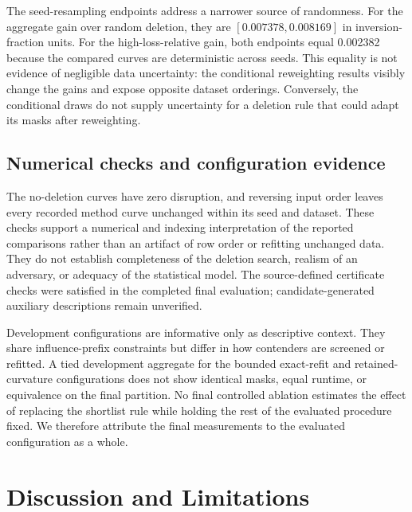 \documentclass{article}
\begin{document}
The seed-resampling endpoints address a narrower source of randomness. For the aggregate gain over random deletion, they are $[0.007378,0.008169]$ in inversion-fraction units. For the high-loss-relative gain, both endpoints equal 0.002382 because the compared curves are deterministic across seeds. This equality is not evidence of negligible data uncertainty: the conditional reweighting results visibly change the gains and expose opposite dataset orderings. Conversely, the conditional draws do not supply uncertainty for a deletion rule that could adapt its masks after reweighting.

\subsection{Numerical checks and configuration evidence}
The no-deletion curves have zero disruption, and reversing input order leaves every recorded method curve unchanged within its seed and dataset. These checks support a numerical and indexing interpretation of the reported comparisons rather than an artifact of row order or refitting unchanged data. They do not establish completeness of the deletion search, realism of an adversary, or adequacy of the statistical model. The source-defined certificate checks were satisfied in the completed final evaluation; candidate-generated auxiliary descriptions remain unverified.

Development configurations are informative only as descriptive context. They share influence-prefix constraints but differ in how contenders are screened or refitted. A tied development aggregate for the bounded exact-refit and retained-curvature configurations does not show identical masks, equal runtime, or equivalence on the final partition. No final controlled ablation estimates the effect of replacing the shortlist rule while holding the rest of the evaluated procedure fixed. We therefore attribute the final measurements to the evaluated configuration as a whole.

\section{Discussion and Limitations}
\end{document}
